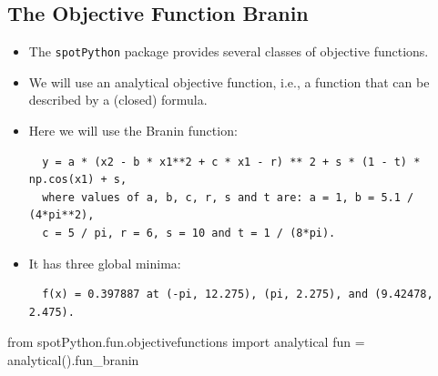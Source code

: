 \documentclass[
  letterpaper,
  DIV=11,
  numbers=noendperiod]{scrreprt}
\newenvironment{Shaded}{\begin{snugshade}}{\end{snugshade}}
\newcommand{\ImportTok}[1]{\textcolor[rgb]{0.00,0.46,0.62}{#1}}
\newcommand{\NormalTok}[1]{\textcolor[rgb]{0.00,0.23,0.31}{#1}}
\newcommand{\OperatorTok}[1]{\textcolor[rgb]{0.37,0.37,0.37}{#1}}
\begin{document}
\subsection{The Objective Function
Branin}\label{the-objective-function-branin-1}

\begin{itemize}
\item
  The \texttt{spotPython} package provides several classes of objective
  functions.
\item
  We will use an analytical objective function, i.e., a function that
  can be described by a (closed) formula.
\item
  Here we will use the Branin function:

\begin{verbatim}
  y = a * (x2 - b * x1**2 + c * x1 - r) ** 2 + s * (1 - t) * np.cos(x1) + s,
  where values of a, b, c, r, s and t are: a = 1, b = 5.1 / (4*pi**2),
  c = 5 / pi, r = 6, s = 10 and t = 1 / (8*pi).
\end{verbatim}
\item
  It has three global minima:

\begin{verbatim}
  f(x) = 0.397887 at (-pi, 12.275), (pi, 2.275), and (9.42478, 2.475).
\end{verbatim}
\end{itemize}

\begin{Shaded}
\begin{Highlighting}[]
\ImportTok{from}\NormalTok{ spotPython.fun.objectivefunctions }\ImportTok{import}\NormalTok{ analytical}
\NormalTok{fun }\OperatorTok{=}\NormalTok{ analytical().fun\_branin}
\end{Highlighting}
\end{Shaded}
\end{document}
